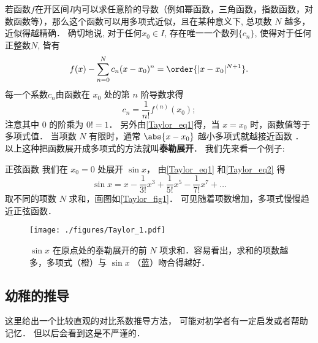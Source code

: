 

若函数$f$在开区间$I$内可以求任意阶的导数（例如幂函数，三角函数，指数函数，对数函数等），那么这个函数可以用多项式近似，且在某种意义下, 总项数 $N$ 越多，近似得越精确． 确切地说, 对于任何$x_0\in I$, 存在唯一一个数列$\{c_n\}$, 使得对于任何正整数$N$, 皆有
\begin{equation}\label{Taylor_eq1}
f(x) -\sum_{n = 0}^N  c_n (x - x_0)^n=\order{|x-x_0|^{N+1}}.
\end{equation}
每一个系数$c_n$由函数在 $x_0$ 处的第 $n$ 阶导数求得
\begin{equation}\label{Taylor_eq2}
c_n = \frac{1}{n!} f^{(n)}(x_0);
\end{equation}
注意其中 0 的阶乘为 $0! = 1$． 另外由\autoref{Taylor_eq1}得，当 $x=x_0$ 时，函数值等于多项式值． 当项数 $N$ 有限时，通常 $\abs{x-x_0}$ 越小多项式就越接近函数 ． 以上这种把函数展开成多项式的方法就叫\textbf{泰勒展开}． 我们先来看一个例子:

\begin{example}{正弦函数}
我们在 $x_0=0$ 处展开 $\sin x$， 由\autoref{Taylor_eq1} 和\autoref{Taylor_eq2} 得
\begin{equation}\label{Taylor_eq3}
\sin x = x - \frac{1}{3!}{x^3} + \frac{1}{5!}{x^5} - \frac{1}{7!} x^7 + \ldots 
\end{equation}
取不同的项数 $N$ 求和，画图如\autoref{Taylor_fig1}． 可见随着项数增加，多项式慢慢趋近正弦函数．

\begin{figure}[ht]
\centering
\texttt{[image: ./figures/Taylor\_1.pdf]}
\caption{$\sin x$ 在原点处的泰勒展开的前 $N$ 项求和．容易看出，求和的项数越多，多项式（橙）与 $\sin x$ （蓝）吻合得越好．}\label{Taylor_fig1}
\end{figure}
\end{example}

\subsection{幼稚的推导}
这里给出一个比较直观的对比系数推导方法， 可能对初学者有一定启发或者帮助记忆． 但以后会看到这是不严谨的．

